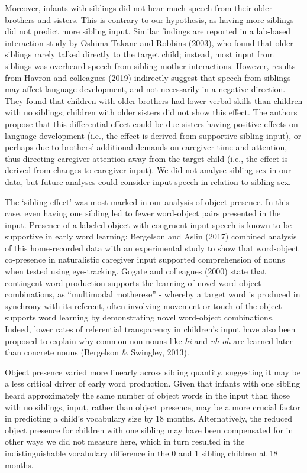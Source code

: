 \documentclass[
  man,floatsintext]{apa6}
\begin{document}
Moreover, infants with siblings did not hear much speech from their older brothers and sisters. This is contrary to our hypothesis, as having more siblings did not predict more sibling input. Similar findings are reported in a lab-based interaction study by Oshima-Takane and Robbins (2003), who found that older siblings rarely talked directly to the target child; instead, most input from siblings was overheard speech from sibling-mother interactions. However, results from Havron and colleagues (2019) indirectly suggest that speech from siblings may affect language development, and not necessarily in a negative direction. They found that children with older brothers had lower verbal skills than children with no siblings; children with older sisters did not show this effect. The authors propose that this differential effect could be due sisters having positive effects on language development (i.e., the effect is derived from supportive sibling input), or perhaps due to brothers' additional demands on caregiver time and attention, thus directing caregiver attention away from the target child (i.e., the effect is derived from changes to caregiver input). We did not analyse sibling sex in our data, but future analyses could consider input speech in relation to sibling sex.

The `sibling effect' was most marked in our analysis of object presence. In this case, even having one sibling led to fewer word-object pairs presented in the input. Presence of a labeled object with congruent input speech is known to be supportive in early word learning: Bergelson and Aslin (2017) combined analysis of this home-recorded data with an experimental study to show that word-object co-presence in naturalistic caregiver input supported comprehension of nouns when tested using eye-tracking. Gogate and colleagues (2000) state that contingent word production supports the learning of novel word-object combinations, as ``multimodal motherese'' - whereby a target word is produced in synchrony with its referent, often involving movement or touch of the object - supports word learning by demonstrating novel word-object combinations. Indeed, lower rates of referential transparency in children's input have also been proposed to explain why common non-nouns like \emph{hi} and \emph{uh-oh} are learned later than concrete nouns (Bergelson \& Swingley, 2013).

Object presence varied more linearly across sibling quantity, suggesting it may be a less critical driver of early word production. Given that infants with one sibling heard approximately the same number of object words in the input than those with no siblings, input, rather than object presence, may be a more crucial factor in predicting a child's vocabulary size by 18 months. Alternatively, the reduced object presence for children with one sibling may have been compensated for in other ways we did not measure here, which in turn resulted in the indistinguishable vocabulary difference in the 0 and 1 sibling children at 18 months.
\end{document}
